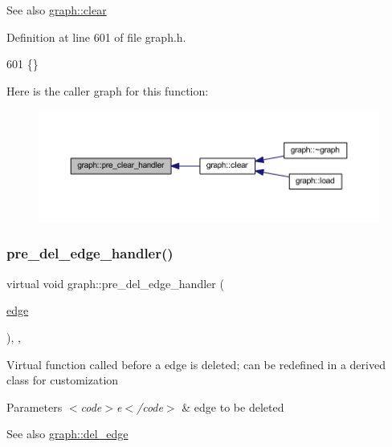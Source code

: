 \begin{DoxySeeAlso}{See also}
\mbox{\hyperlink{classgraph_a9ff5d6af3653e79f87b836701453f55a}{graph\+::clear}} 
\end{DoxySeeAlso}


Definition at line 601 of file graph.\+h.


\begin{DoxyCode}
601 \{\}
\end{DoxyCode}
Here is the caller graph for this function\+:
\nopagebreak
\begin{figure}[H]
\begin{center}
\leavevmode
\includegraphics[width=350pt]{classgraph_a16ccad78837d16be59854549cd2d847a_icgraph}
\end{center}
\end{figure}
\mbox{\label{classgraph_a2cd0986dc5bcbfdbf0635c39e610784b}} 
\subsubsection{\texorpdfstring{pre\+\_\+del\+\_\+edge\+\_\+handler()}{pre\_del\_edge\_handler()}}
{\footnotesize\ttfamily virtual void graph\+::pre\+\_\+del\+\_\+edge\+\_\+handler (\begin{DoxyParamCaption}\item[{\mbox{\hyperlink{classedge}{edge}}}]{ }\end{DoxyParamCaption})\hspace{0.3cm}{\ttfamily [inline]}, {\ttfamily [virtual]}, {\ttfamily [inherited]}}

Virtual function called before a edge is deleted; can be redefined in a derived class for customization


\begin{DoxyParams}{Parameters}
{\em $<$code$>$e$<$/code$>$} & edge to be deleted \\
\hline
\end{DoxyParams}
\begin{DoxySeeAlso}{See also}
\mbox{\hyperlink{classgraph_ad9356508c49c542dfd4b7169297387c6}{graph\+::del\+\_\+edge}} 
\end{DoxySeeAlso}


